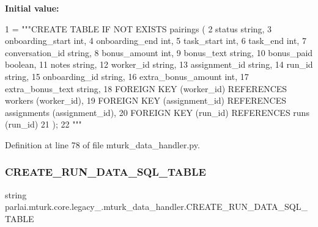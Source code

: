 {\bfseries Initial value\+:}
\begin{DoxyCode}
1 =  \textcolor{stringliteral}{"""CREATE TABLE IF NOT EXISTS pairings (}
2 \textcolor{stringliteral}{        status string,}
3 \textcolor{stringliteral}{        onboarding\_start int,}
4 \textcolor{stringliteral}{        onboarding\_end int,}
5 \textcolor{stringliteral}{        task\_start int,}
6 \textcolor{stringliteral}{        task\_end int,}
7 \textcolor{stringliteral}{        conversation\_id string,}
8 \textcolor{stringliteral}{        bonus\_amount int,}
9 \textcolor{stringliteral}{        bonus\_text string,}
10 \textcolor{stringliteral}{        bonus\_paid boolean,}
11 \textcolor{stringliteral}{        notes string,}
12 \textcolor{stringliteral}{        worker\_id string,}
13 \textcolor{stringliteral}{        assignment\_id string,}
14 \textcolor{stringliteral}{        run\_id string,}
15 \textcolor{stringliteral}{        onboarding\_id string,}
16 \textcolor{stringliteral}{        extra\_bonus\_amount int,}
17 \textcolor{stringliteral}{        extra\_bonus\_text string,}
18 \textcolor{stringliteral}{        FOREIGN KEY (worker\_id) REFERENCES workers (worker\_id),}
19 \textcolor{stringliteral}{        FOREIGN KEY (assignment\_id) REFERENCES assignments (assignment\_id),}
20 \textcolor{stringliteral}{        FOREIGN KEY (run\_id) REFERENCES runs (run\_id)}
21 \textcolor{stringliteral}{    );}
22 \textcolor{stringliteral}{    """}
\end{DoxyCode}


Definition at line 78 of file mturk\+\_\+data\+\_\+handler.\+py.

\mbox{\label{namespaceparlai_1_1mturk_1_1core_1_1legacy__2018_1_1mturk__data__handler_aeb74121e51799249138091bde9fb07db}} 
\subsubsection{\texorpdfstring{C\+R\+E\+A\+T\+E\+\_\+\+R\+U\+N\+\_\+\+D\+A\+T\+A\+\_\+\+S\+Q\+L\+\_\+\+T\+A\+B\+LE}{CREATE\_RUN\_DATA\_SQL\_TABLE}}
{\footnotesize\ttfamily string parlai.\+mturk.\+core.\+legacy\+\_.\+mturk\+\_\+data\+\_\+handler.\+C\+R\+E\+A\+T\+E\+\_\+\+R\+U\+N\+\_\+\+D\+A\+T\+A\+\_\+\+S\+Q\+L\+\_\+\+T\+A\+B\+LE}

